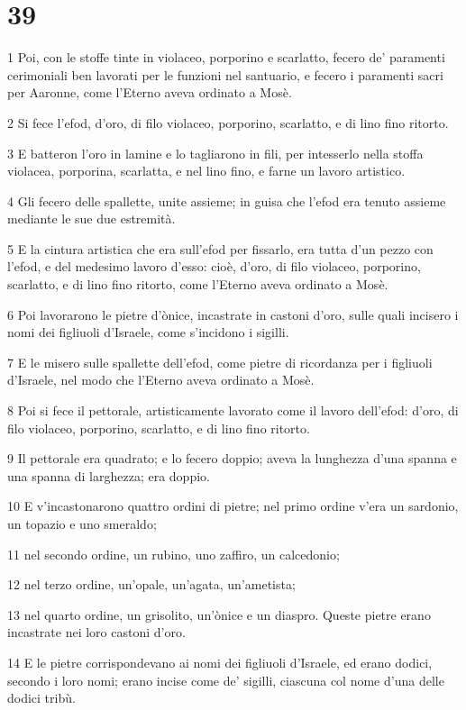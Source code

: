 \chapter{39}

\par 1 Poi, con le stoffe tinte in violaceo, porporino e scarlatto, fecero de' paramenti cerimoniali ben lavorati per le funzioni nel santuario, e fecero i paramenti sacri per Aaronne, come l'Eterno aveva ordinato a Mosè.
\par 2 Si fece l'efod, d'oro, di filo violaceo, porporino, scarlatto, e di lino fino ritorto.
\par 3 E batteron l'oro in lamine e lo tagliarono in fili, per intesserlo nella stoffa violacea, porporina, scarlatta, e nel lino fino, e farne un lavoro artistico.
\par 4 Gli fecero delle spallette, unite assieme; in guisa che l'efod era tenuto assieme mediante le sue due estremità.
\par 5 E la cintura artistica che era sull'efod per fissarlo, era tutta d'un pezzo con l'efod, e del medesimo lavoro d'esso: cioè, d'oro, di filo violaceo, porporino, scarlatto, e di lino fino ritorto, come l'Eterno aveva ordinato a Mosè.
\par 6 Poi lavorarono le pietre d'ònice, incastrate in castoni d'oro, sulle quali incisero i nomi dei figliuoli d'Israele, come s'incidono i sigilli.
\par 7 E le misero sulle spallette dell'efod, come pietre di ricordanza per i figliuoli d'Israele, nel modo che l'Eterno aveva ordinato a Mosè.
\par 8 Poi si fece il pettorale, artisticamente lavorato come il lavoro dell'efod: d'oro, di filo violaceo, porporino, scarlatto, e di lino fino ritorto.
\par 9 Il pettorale era quadrato; e lo fecero doppio; aveva la lunghezza d'una spanna e una spanna di larghezza; era doppio.
\par 10 E v'incastonarono quattro ordini di pietre; nel primo ordine v'era un sardonio, un topazio e uno smeraldo;
\par 11 nel secondo ordine, un rubino, uno zaffiro, un calcedonio;
\par 12 nel terzo ordine, un'opale, un'agata, un'ametista;
\par 13 nel quarto ordine, un grisolito, un'ònice e un diaspro. Queste pietre erano incastrate nei loro castoni d'oro.
\par 14 E le pietre corrispondevano ai nomi dei figliuoli d'Israele, ed erano dodici, secondo i loro nomi; erano incise come de' sigilli, ciascuna col nome d'una delle dodici tribù.

